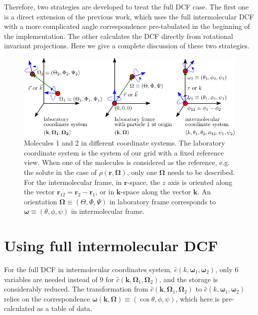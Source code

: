 Therefore, two strategies are developed to treat the full \acs{DCF}
case. The first one is a direct extension of the previous work, which
uses the full intermolecular \acs{DCF} with a more complicated angle
correspondence pre-tabulated in the beginning of the implementation.
The other calculates the \acs{DCF} directly from rotational invariant
projections. Here we give a complete discussion of these two strategies.

\begin{figure}[H]
\begin{centering}
\includegraphics{_figure/coordinate_system}
\par\end{centering}
\caption[Molecules 1 and 2 in different coordinate systems]{Molecules 1 and 2 in different coordinate systems. The laboratory
coordinate system is the system of our grid with a fixed reference
view. When one of the molecules is considered as the reference, e.g.
the solute in the case of $\rho(\mathbf{r},\mathbf{\Omega})$, only
one $\mathbf{\Omega}$ needs to be described. For the intermolecular
frame, in $\mathbf{r}$-space, the $z$ axis is oriented along the
vector $\mathbf{r}_{12}=\mathbf{r}_{2}-\mathbf{r}_{1}$, or in $\mathbf{k}$-space
along the vector $\mathbf{k}$. An orientation $\mathbf{\Omega}\equiv(\Theta,\Phi,\Psi)$
in laboratory frame corresponds to $\boldsymbol{\omega}\equiv(\theta,\phi,\psi)$
in intermolecular frame.\label{fig:coordinate_systems}}
\end{figure}


\section{Using full intermolecular DCF}

For the full \acs{DCF} in intermolecular coordinates system, $\hat{c}(k,\boldsymbol{\omega}_{1},\boldsymbol{\omega}_{2})$,
only 6 variables are needed instead of 9 for $\hat{c}(\mathbf{k},\mathbf{\Omega}_{1},\mathbf{\Omega}_{2})$,
and the storage is considerably reduced. The transformation from $\hat{c}(\mathbf{k},\mathbf{\Omega}_{1},\mathbf{\Omega}_{2})$
to $\hat{c}(k,\boldsymbol{\omega}_{1},\boldsymbol{\omega}_{2})$ relies
on the correspondence $\boldsymbol{\omega}(\mathbf{k},\mathbf{\Omega})\equiv(\cos\theta,\phi,\psi)$,
which here is pre-calculated as a table of data.

